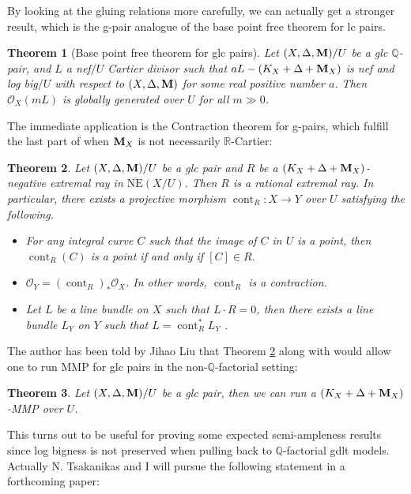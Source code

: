 \documentclass[11pt]{amsart}
\numberwithin{equation}{section}
\newcommand{\Mm}{{\bf{M}}}
\newcommand{\Qq}{\mathbb{Q}}
\newcommand{\Rr}{\mathbb{R}}
\newcommand{\cont}{\operatorname{cont}}
\newcommand{\Oo}{\mathcal{O}}
\newcommand{\NE}{\mathrm{NE}}
\newtheorem{thm}{Theorem}[section]
\theoremstyle{definition}
\theoremstyle{definition}
\theoremstyle{definition}
\begin{document}
By looking at the gluing relations more carefully, we can actually get a stronger result, which is the g-pair analogue of the base point free theorem for lc pairs.

\begin{thm}[Base point free theorem for glc pairs]\label{thm: bpf thm for g-pairs}
Let $(X,\Delta,\Mm)/U$ be a glc $\Qq$-pair, and $L$ a nef$/U$ Cartier divisor such that $aL-(K_X+\Delta+\Mm_X)$ is nef and log big$/U$ with respect to $(X,\Delta,\Mm)$ for some real positive number $a$. Then $\Oo_X(mL)$ is globally generated over $U$ for all $m\gg 0$. 
\end{thm}

The immediate application is the Contraction theorem for g-pairs, which fulfill the last part of \cite[Theorem 1.3]{HL21a} when $\Mm_X$ is not necessarily $\Rr$-Cartier:

\begin{thm}\label{thm: Contraction thm for g-pairs}
Let $(X,\Delta,\Mm)/U$ be a glc pair and $R$ be a $(K_X+\Delta+\Mm_X)$-negative extremal ray in
$\overline{\NE}(X/U)$. Then $R$ is a rational extremal ray. In particular, there exists a projective
morphism $\cont_R:X\to Y$ over $U$ satisfying the following.
\begin{itemize}
    \item For any integral curve $C$ such that the image of $C$ in $U$ is a point, then $\cont_R(C)$ is a point if and only if $[C]\in R$.
    \item $\Oo_Y=(\cont_R)_*\Oo_X$. In other words, $\cont_R$ is a contraction.
    \item Let $L$ be a line bundle on $X$ such that $L\cdot R=0$, then there exists a line bundle $L_Y$ on $Y$ such that $L=\cont_R^*L_Y$ .
\end{itemize}
\end{thm}

The author has been told by Jihao Liu that Theorem \ref{thm: Contraction thm for g-pairs} along with \cite[Theorem 1.1]{LX22b} would allow one to run MMP for glc pairs in the non-$\Qq$-factorial setting:

\begin{thm}\label{thm: mmp for glc pairs}
Let $(X,\Delta,\Mm)/U$ be a glc pair, then we can run a $(K_X+\Delta+\Mm_X)$-MMP over $U$.  
\end{thm}

This turns out to be useful for proving some expected semi-ampleness results since log bigness is not preserved when pulling back to $\Qq$-factorial gdlt models. Actually N. Tsakanikas and I will pursue the following statement in a forthcoming paper:
\end{document}
